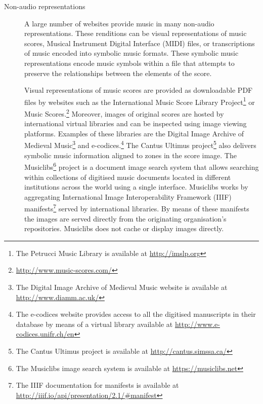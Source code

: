 \begin{description}
\item [Non-audio representations]
A large number of websites provide music in many non-audio representations. These renditions can be visual representations of music scores, Musical Instrument Digital Interface (MIDI) files, or transcriptions of music encoded into symbolic music formats. 
These symbolic music representations encode music symbols within a file that attempts to preserve the relationships between the elements of the score.

Visual representations of music scores are provided as downloadable PDF files by websites such as the International Music Score Library Project\footnote{The Petrucci Music Library is available at \url{http://imslp.org}} or Music Scores.\footnote{\url{http://www.music-scores.com/}} Moreover, images of original scores are hosted by international virtual libraries and can be inspected using image viewing platforms. Examples of these libraries are the Digital Image Archive of Medieval Music\footnote{The Digital Image Archive of Medieval Music website is available at \url{http://www.diamm.ac.uk/}} and e-codices.\footnote{The e-codices website provides access to all the digitised manuscripts in their database by means of a virtual library available at \url{http://www.e-codices.unifr.ch/en}}  The Cantus Ultimus project\footnote{The Cantus Ultimus project is available at \url{http://cantus.simssa.ca/}} also delivers symbolic music information aligned to zones in the score image. 
The Musiclibs\footnote{The Musiclibs image search system is available at \url{https://musiclibs.net}} project is a document image search system that allows searching within collections of digitised music documents located in different institutions across the world using a single interface. Musiclibs works by aggregating International Image Interoperability Framework (IIIF) manifests\footnote{The IIIF documentation for manifests is available at \url{http://iiif.io/api/presentation/2.1/#manifest}} served by international libraries. By means of these manifests the images are served directly from the originating organisation's repositories. Musiclibs does not cache or display images directly.


\end{description}
